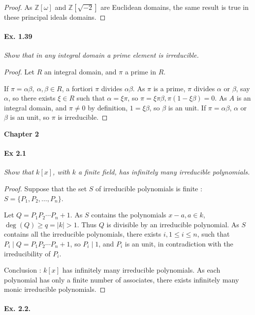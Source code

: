 \documentclass[11pt,a4paper]{article}
\newcommand{\Z}{\mathbb{Z}}
\begin{document}
{\begin{proof}
As $\Z[\omega]$ and $\Z[\sqrt{-2}]$ are Euclidean domains, the same result is true in these principal ideals domains.
\end{proof}

\paragraph{Ex. 1.39}

{\it Show that in any integral domain a prime element is irreducible.
}

\begin{proof}
Let $R$ an integral domain, and $\pi$ a prime in $R$.

If $\pi = \alpha \beta, \ \alpha, \beta \in R$, a fortiori $\pi$ divides $\alpha \beta$. As $\pi$ is a prime, $\pi$ divides $\alpha$ or $\beta$, say $\alpha$, so there exists $\xi \in R$ such that $\alpha = \xi \pi$, so $\pi = \xi \pi \beta, \pi(1 - \xi \beta)= 0$. As $A$ is an integral domain, and $\pi \neq 0$ by definition,  $1 = \xi \beta$, so $\beta$ is an unit. If  $\pi = \alpha \beta$, $\alpha$ or $\beta$ is an unit, so $\pi$ is irreducible.
\end{proof}


{\large \bf Chapter 2}


\paragraph { Ex 2.1} 


{\it Show that $k[x]$, with $k$ a finite field, has infinitely many irreducible polynomials.
}

\begin{proof}
Suppose that the set $S$ of irreducible polynomials is finite : $S = \{P_1,P_2,\ldots,P_n\}$. 

Let $Q = P_1P_2\cdots P_n + 1$. As $S$ contains the polynomials $x-a,a \in k$, $\deg(Q) \geq  q=\vert k \vert >1$. Thus $Q$ is divisible by an irreducible polynomial. As $S$ contains all the irreducible polynomials, there exists $i, 1\leq i \leq n$, such that $P_i \mid Q = P_1P_2\cdots P_n + 1$, so $P_i \mid 1$, and $P_i$ is an unit, in contradiction with the irreducibility of $P_i$.

Conclusion : $k[x]$ has  infinitely many irreducible polynomials. As each polynomial has only a finite number of associates, there exists infinitely many monic irreducible polynomials.
\end{proof}

\paragraph{Ex. 2.2.}

}
\end{document}
